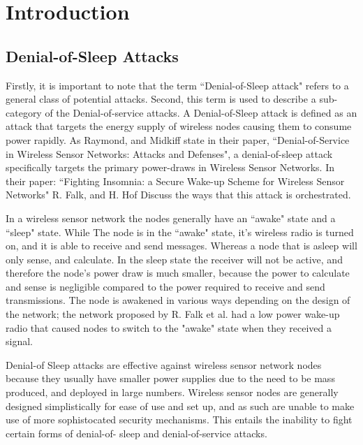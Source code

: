 \section{Introduction}

\subsection{Denial-of-Sleep Attacks}
 
Firstly, it is important to note that the term ``Denial-of-Sleep attack" refers to a general class of potential attacks. Second, this term is used to describe a sub-category of the Denial-of-service attacks. A Denial-of-Sleep 
attack is defined as an attack that targets the energy supply of wireless nodes causing them to consume power rapidly. As Raymond, and Midkiff state in their paper, ``Denial-of-Service in Wireless Sensor Networks: 
Attacks and Defenses", a denial-of-sleep attack specifically targets the primary power-draws in Wireless Sensor Networks\cite{4431860}. In their paper: ``Fighting Insomnia: a Secure Wake-up Scheme for Wireless Sensor Networks" 
R. Falk, and H. Hof Discuss the ways that this attack is orchestrated\cite{5211020}. 

In a wireless sensor network the nodes generally have an ``awake" state and a ``sleep" state\cite{5211020}. While The node is in the ``awake" state, it's wireless radio is turned on, and it is able to receive and send messages. 
Whereas a node that is asleep will only sense, and calculate. In the sleep state the receiver will not be active, and therefore the node's power draw is much smaller, because the power to calculate and sense is negligible 
compared to the power required to receive and send transmissions. The node is awakened in various ways depending on the design of the network; the network proposed by R. Falk et al. had a low power wake-up radio that caused nodes
to switch to the "awake" state when they received a signal. 

Denial-of Sleep attacks are effective against wireless sensor network nodes because they usually have smaller power supplies due to the need to be mass produced, and deployed in large numbers\cite{4602623}. Wireless sensor 
nodes are generally designed simplistically for ease of use and set up, and as such are unable to make use of more sophistocated security mechanisms\cite{4476299}. This entails the inability to fight certain forms of denial-of-
sleep and denial-of-service attacks.

